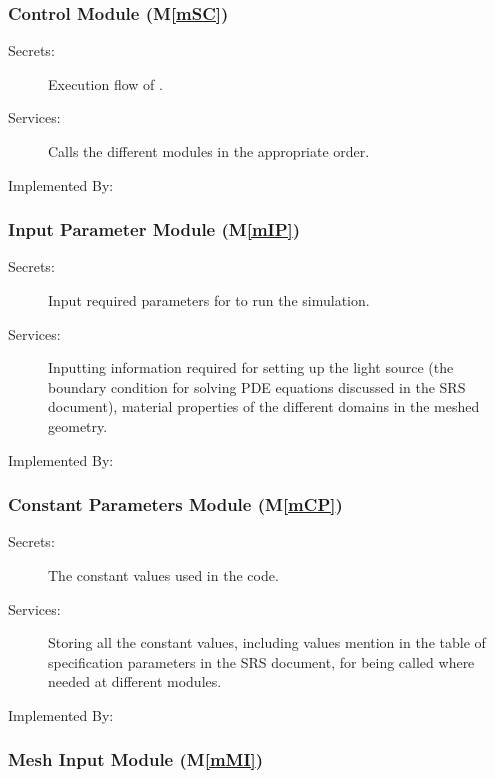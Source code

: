 \documentclass[12pt, titlepage]{article}
\newcommand{\mref}[1]{M\ref{#1}}
\begin{document}
	
	
	\subsubsection{\progname{} Control Module (\mref{mSC})}
	
	\begin{description} \item[Secrets:]Execution flow of \progname{}.
		\item[Services:]Calls the different modules in the appropriate order.
		\item[Implemented By:] \progname{} \end{description}
	
	
	
	
	\subsubsection{Input Parameter Module (\mref{mIP})}
	
	\begin{description} \item[Secrets:]Input required parameters for \progname{} to
		run the simulation. \item[Services:]Inputting information required for setting
		up the light source (the boundary condition for solving PDE equations discussed
		in the SRS document), material properties of the different domains in the
		meshed geometry. \item[Implemented By:] \progname{} \end{description}
	
	
	
	
	\subsubsection{Constant Parameters Module (\mref{mCP})}
	
	\begin{description} \item[Secrets:] The constant values used in the code.
		\item[Services:] Storing all the constant values, including values mention in
		the table of specification parameters in the SRS document, for being called
		where needed at different modules. \item[Implemented By:] \progname{}
	\end{description}
	
	
	
	\subsubsection{Mesh Input Module (\mref{mMI})}
	
\end{document}
